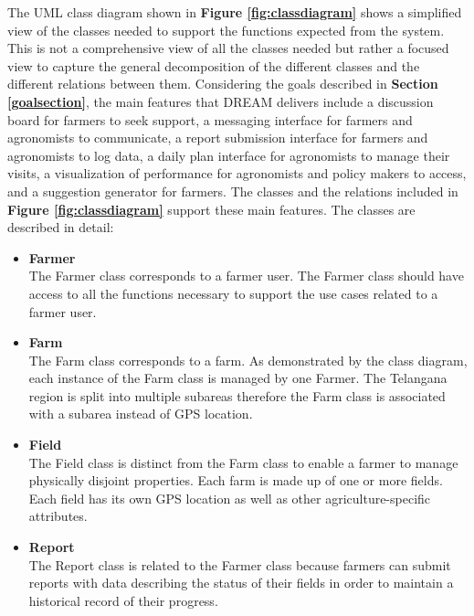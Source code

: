 \begin{flushleft}
The UML class diagram shown in \textbf{Figure \ref{fig:classdiagram}} shows a simplified view of the classes needed to support the functions expected from the system. This is not a comprehensive view of all the classes needed but rather a focused view to capture the general decomposition of the different classes and the different relations between them. Considering the goals described in \textbf{Section \ref{goalsection}}, the main features that DREAM delivers include a discussion board for farmers to seek support, a messaging interface for farmers and agronomists to communicate, a report submission interface for farmers and agronomists to log data, a daily plan interface for agronomists to manage their visits, a visualization of performance for agronomists and policy makers to access, and a suggestion generator for farmers. The classes and the relations included in \textbf{Figure \ref{fig:classdiagram}} support these main features. The classes are described in detail:

\begin{itemize}

\item \textbf{Farmer}\\
The Farmer class corresponds to a farmer user. The Farmer class should have access to all the functions necessary to support the use cases related to a farmer user. 

\item \textbf{Farm}\\
The Farm class corresponds to a farm. As demonstrated by the class diagram, each instance of the Farm class is managed by one Farmer. The Telangana region is split into multiple subareas therefore the Farm class is associated with a subarea instead of GPS location.

\item \textbf{Field}\\
The Field class is distinct from the Farm class to enable a farmer to manage physically disjoint properties. Each farm is made up of one or more fields. Each field has its own GPS location as well as other agriculture-specific attributes.

\item \textbf{Report}\\
The Report class is related to the Farmer class because farmers can submit reports with data describing the status of their fields in order to maintain a historical record of their progress. 


\end{itemize}
\end{flushleft}
